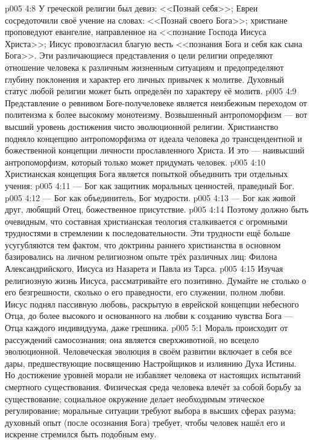 \vs p005 4:8 У греческой религии был девиз: <<Познай себя>>; Евреи сосредоточили своё учение на словах: <<Познай своего Бога>>; христиане проповедуют евангелие, направленное на <<познание Господа Иисуса Христа>>; Иисус провозгласил благую весть <<познания Бога и себя как сына Бога>>. Эти различающиеся представления о цели религии определяют отношение человека к различным жизненным ситуациям и предопределяют глубину поклонения и характер его личных привычек к молитве. Духовный статус любой религии может быть определён по характеру её молитв.
\vs p005 4:9 \pc Представление о ревнивом Боге\hyp{}получеловеке является неизбежным переходом от политеизма к более высокому монотеизму. Возвышенный антропоморфизм --- вот высший уровень достижения чисто эволюционной религии. Христианство подняло концепцию антропоморфизма от идеала человека до трансцендентной и божественной концепции личности прославленного Христа. И это --- наивысший антропоморфизм, который только может придумать человек.
\vs p005 4:10 \pc Христианская концепция Бога является попыткой объединить три отдельных учения:
\vs p005 4:11 \bibnobreakspace {} --- Бог как защитник моральных ценностей, праведный Бог.
\vs p005 4:12 \bibnobreakspace {} --- Бог как объединитель, Бог мудрости.
\vs p005 4:13 \bibnobreakspace {} --- Бог как живой друг, любящий Отец, божественное присутствие.
\vs p005 4:14 \pc Поэтому должно быть очевидным, что составная христианская теология сталкивается с огромными трудностями в стремлении к последовательности. Эти трудности ещё больше усугубляются тем фактом, что доктрины раннего христианства в основном базировались на личном религиозном опыте трёх различных лиц: Филона Александрийского, Иисуса из Назарета и Павла из Тарса.
\vs p005 4:15 \pc Изучая религиозную жизнь Иисуса, рассматривайте его позитивно. Думайте не столько о его безгрешности, сколько о его праведности, его служении, полном любви. Иисус поднял пассивную любовь, раскрытую в еврейской концепции небесного Отца, до более высокого  и основанного на любви к созданию чувства Бога --- Отца каждого индивидуума, даже грешника.
\vs p005 5:1 Мораль происходит от рассуждений самосознания; она является сверхживотной, но всецело эволюционной. Человеческая эволюция в своём развитии включает в себя все дары, предшествующие посвящению Настройщиков и излиянию Духа Истины. Но достижение уровней морали не избавляет человека от настоящих испытаний смертного существования. Физическая среда человека влечёт за собой борьбу за существование; социальное окружение делает необходимым этическое регулирование; моральные ситуации требуют выбора в высших сферах разума; духовный опыт (после осознания Бога) требует, чтобы человек нашёл его и искренне стремился быть подобным ему.
